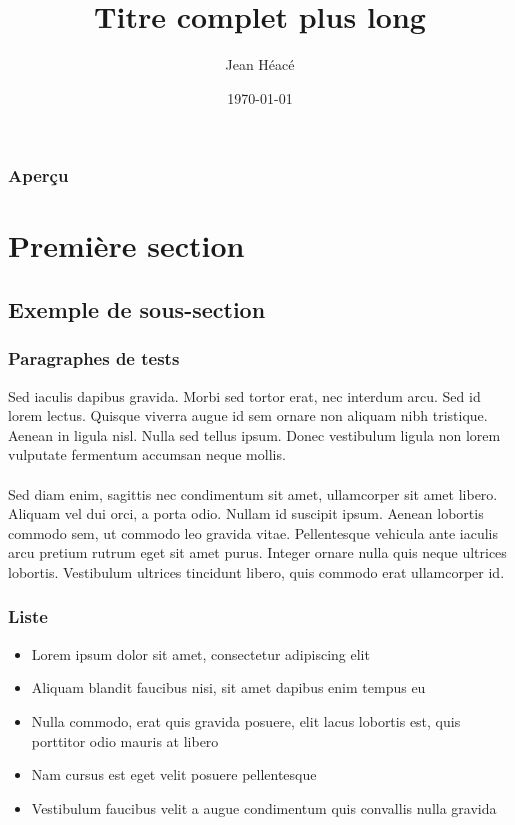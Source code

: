 \documentclass{beamer}
\title[Titre court]{Titre complet plus long}
\author{Jean Héacé}
\institute[ulaval] 
{
Université Laval \\
\medskip
\textit{jean.heace.1@ulaval.ca}
}
\date{\today}
\begin{document}
\begin{frame}
\titlepage
\end{frame}

\begin{frame}
\frametitle{Aperçu}
\tableofcontents 
\end{frame}


\section{Première section}

\subsection{Exemple de sous-section}

\begin{frame}
\frametitle{Paragraphes de tests}
Sed iaculis dapibus gravida. Morbi sed tortor erat, nec interdum arcu. Sed id lorem lectus. Quisque viverra augue id sem ornare non aliquam nibh tristique. Aenean in ligula nisl. Nulla sed tellus ipsum. Donec vestibulum ligula non lorem vulputate fermentum accumsan neque mollis.\\~\\

Sed diam enim, sagittis nec condimentum sit amet, ullamcorper sit amet libero. Aliquam vel dui orci, a porta odio. Nullam id suscipit ipsum. Aenean lobortis commodo sem, ut commodo leo gravida vitae. Pellentesque vehicula ante iaculis arcu pretium rutrum eget sit amet purus. Integer ornare nulla quis neque ultrices lobortis. Vestibulum ultrices tincidunt libero, quis commodo erat ullamcorper id.
\end{frame}

\begin{frame}
\frametitle{Liste}
\begin{itemize}
\item Lorem ipsum dolor sit amet, consectetur adipiscing elit
\item Aliquam blandit faucibus nisi, sit amet dapibus enim tempus eu
\item Nulla commodo, erat quis gravida posuere, elit lacus lobortis est, quis porttitor odio mauris at libero
\item Nam cursus est eget velit posuere pellentesque
\item Vestibulum faucibus velit a augue condimentum quis convallis nulla gravida
\end{itemize}
\end{frame}
\end{document}
